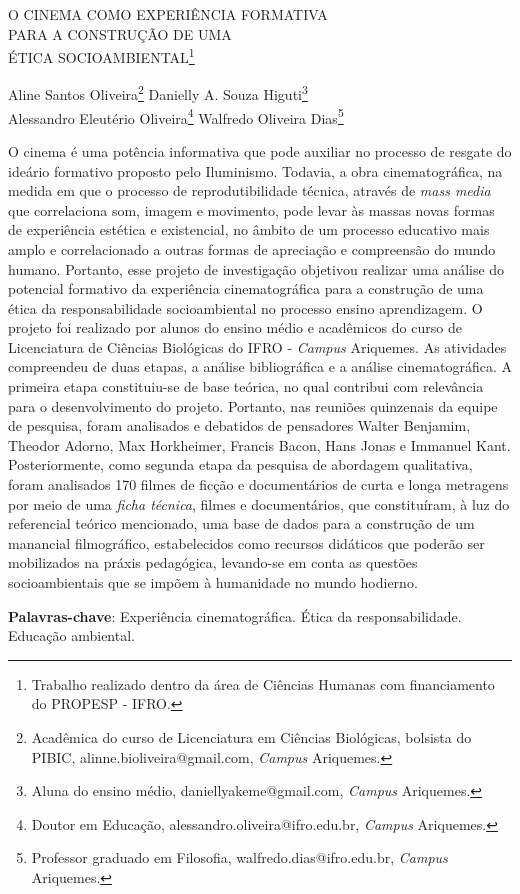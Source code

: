 \documentclass[article,12pt,onesidea,4paper,english,brazil]{abntex2}
\begin{document}
	
	
	\frenchspacing 
	
	\begin{center}
		\LARGE O CINEMA COMO EXPERIÊNCIA FORMATIVA\\PARA A CONSTRUÇÃO DE UMA\\
		ÉTICA SOCIOAMBIENTAL\footnote{Trabalho realizado dentro da área de Ciências Humanas com financiamento do PROPESP - IFRO.}
		
		\normalsize
		Aline Santos Oliveira\footnote{Acadêmica do curso de Licenciatura em Ciências Biológicas, bolsista do PIBIC, alinne.bioliveira@gmail.com, \textit{Campus} Ariquemes.} 
		Danielly A. Souza Higuti\footnote{Aluna do ensino médio, daniellyakeme@gmail.com, \textit{Campus} Ariquemes.} \\
		Alessandro Eleutério Oliveira\footnote{Doutor em Educação, alessandro.oliveira@ifro.edu.br, \textit{Campus} Ariquemes.} 
		Walfredo Oliveira Dias\footnote{Professor graduado em Filosofia, walfredo.dias@ifro.edu.br, \textit{Campus} Ariquemes.} 
	\end{center}
	
	\noindent O cinema é uma potência informativa que pode auxiliar no processo de resgate do
	ideário formativo proposto pelo Iluminismo. Todavia, a obra cinematográfica, na
	medida em que o processo de reprodutibilidade técnica, através de \textit{mass media} que
	correlaciona som, imagem e movimento, pode levar às massas novas formas de
	experiência estética e existencial, no âmbito de um processo educativo mais amplo e
	correlacionado a outras formas de apreciação e compreensão do mundo humano.
	Portanto, esse projeto de investigação objetivou realizar uma análise do potencial
	formativo da experiência cinematográfica para a construção de uma ética da
	responsabilidade socioambiental no processo ensino aprendizagem. O projeto foi
	realizado por alunos do ensino médio e acadêmicos do curso de Licenciatura de
	Ciências Biológicas do IFRO - \textit{Campus} Ariquemes. As atividades compreendeu de
	duas etapas, a análise bibliográfica e a análise cinematográfica. A primeira etapa
	constituiu-se de base teórica, no qual contribui com relevância para o
	desenvolvimento do projeto. Portanto, nas reuniões quinzenais da equipe de
	pesquisa, foram analisados e debatidos de pensadores Walter Benjamim, Theodor
	Adorno, Max Horkheimer, Francis Bacon, Hans Jonas e Immanuel Kant.
	Posteriormente, como segunda etapa da pesquisa de abordagem qualitativa, foram
	analisados 170 filmes de ficção e documentários de curta e longa metragens por
	meio de uma \textit{ficha técnica}, filmes e documentários, que constituíram, à luz do
	referencial teórico mencionado, uma base de dados para a construção de um
	manancial filmográfico, estabelecidos como recursos didáticos que poderão ser
	mobilizados na práxis pedagógica, levando-se em conta as questões
	socioambientais que se impõem à humanidade no mundo hodierno.
	
	\vspace{\onelineskip}
	
	\noindent
	\textbf{Palavras-chave}: Experiência cinematográfica. Ética da responsabilidade. Educação ambiental.	
	
\end{document}

